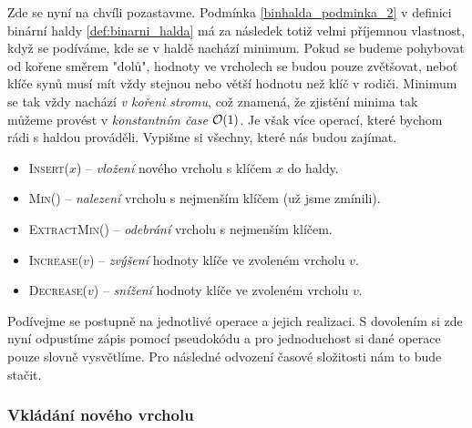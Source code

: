 Zde se nyní na chvíli pozastavme. Podmínka \ref{binhalda_podminka_2} v definici binární haldy \ref{def:binarni_halda} má za následek totiž velmi příjemnou vlastnost, když se podíváme, kde se v haldě nachází minimum. Pokud se budeme pohybovat od kořene směrem "dolů", hodnoty ve vrcholech se budou pouze zvětšovat, neboť klíče synů musí mít vždy stejnou nebo větší hodnotu než klíč v rodiči. Minimum se tak vždy nachází \emph{v kořeni stromu}, což znamená, že zjistění minima tak můžeme provést v \emph{konstantním čase} $\mathcal{O}(1)$.
Je však více operací, které bychom rádi s haldou prováděli. Vypišme si všechny, které nás budou zajímat.
\begin{itemize}
    \item \textsc{Insert}($x$) -- \emph{vložení} nového vrcholu s klíčem $x$ do haldy.
    \item \textsc{Min}() -- \emph{nalezení} vrcholu s nejmenším klíčem (už jsme zmínili).
    \item \textsc{ExtractMin}() -- \emph{odebrání} vrcholu s nejmenším klíčem.
    \item \textsc{Increase}($v$) -- \emph{zvýšení} hodnoty klíče ve zvoleném vrcholu $v$.
    \item \textsc{Decrease}($v$) -- \emph{snížení} hodnoty klíče ve zvoleném vrcholu $v$.
\end{itemize}

Podívejme se postupně na jednotlivé operace a jejich realizaci. S dovolením si zde nyní odpustíme zápis pomocí pseudokódu a pro jednoduchost si dané operace pouze slovně vysvětlíme. Pro následné odvození časové složitosti nám to bude stačit.

\subsubsection{Vkládání nového vrcholu}

